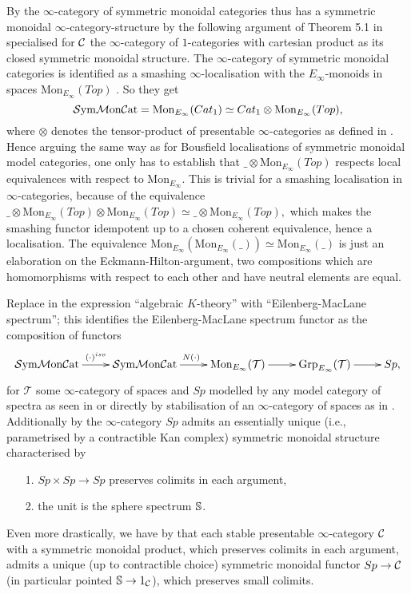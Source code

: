 By \cite{GGN} the $\infty$-category of symmetric monoidal categories
thus has a symmetric monoidal $\infty$-category-structure by the following 
argument of Theorem 5.1 in \cite{GGN} specialised for $\C$ the $\infty$-category of 
$1$-categories with cartesian product as its closed symmetric monoidal structure.
The $\infty$-category of symmetric monoidal categories is identified 
as a smashing $\infty$-localisation with the $E_\infty$-monoids 
in spaces $\mathrm{Mon}_{E_\infty}(Top)$ \cite[Theorem 4.6]{GGN}. So they get 
\[\SymMonCat=\mathrm{Mon}_{E_\infty}(Cat_1)\simeq Cat_1\otimes 
\mathrm{Mon}_{E_\infty}(Top),\] 
where $\otimes$ denotes the tensor-product of presentable $\infty$-categories as
defined in \cite{Lu2}. Hence arguing the same way as for Bousfield
localisations of symmetric monoidal model categories, one only has to establish
that $\_\otimes \mathrm{Mon}_{E_\infty}(Top)$ respects local equivalences with
respect to $\mathrm{Mon}_{E_\infty}$. This is trivial for a smashing localisation 
in $\infty$-categories, because of the equivalence 
$\_\otimes \mathrm{Mon}_{E_\infty}(Top)\otimes 
\mathrm{Mon}_{E_\infty}(Top) \simeq \_\otimes \mathrm{Mon}_{E_\infty}(Top),$ 
which makes the smashing functor idempotent up to a chosen coherent
equivalence, hence a localisation. The 
equivalence $\mathrm{Mon}_{E_\infty}(\mathrm{Mon}_{E_\infty}(\_))\simeq \mathrm{Mon}_{E_\infty}(\_)$
is just an elaboration on the Eckmann-Hilton-argument, two 
compositions which are homomorphisms with respect to each other and 
have neutral elements are equal.

Replace in \cite[p. 19]{GGN} the expression ``algebraic $K$-theory'' with 
``Eilenberg-MacLane spectrum''; this 
identifies the Eilenberg-MacLane spectrum functor as the composition of functors
\[\xymatrix{\SymMonCat \ar[r]^{(\cdot)^{iso}} &\SymMonCat 
\ar[r]^{N(\cdot)} & \mathrm{Mon}_{E_\infty}(\mathcal{T})
\ar[r] & \mathrm{Grp}_{E_\infty}(\mathcal{T}) \ar[r] & Sp,}\]
for $\mathcal{T}$ some $\infty$-category of spaces
and $Sp$ modelled by any model category
of spectra as seen in \cite{MMSS} or directly by stabilisation of
an $\infty$-category of spaces as in \cite[Section 1.4.3]{Lu2}.
Additionally by \cite[p. 624]{Lu2} the $\infty$-category
$Sp$ admits an essentially unique (i.e., parametrised by a contractible
Kan complex) symmetric monoidal structure characterised by \begin{itemize}
\item[1.] $Sp\times Sp\rightarrow Sp$ preserves colimits in each argument,
\item[2.] the unit is the sphere spectrum $\S$. \end{itemize}
Even more drastically, we have by \cite[Corollary 6.3.2.19]{Lu2} that each
stable presentable $\infty$-category $\C$ with a symmetric monoidal product,
which preserves colimits in each argument, admits a unique (up to 
contractible choice) symmetric monoidal functor $Sp\rightarrow \C$ (in particular
pointed $\S\rightarrow 1_\C$), which preserves small colimits.

